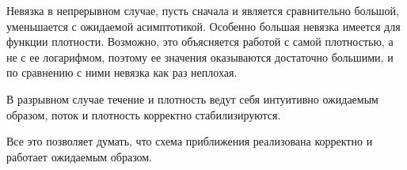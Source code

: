 \documentclass[a4paper,11pt]{article}
\begin{document}
Невязка в непрерывном случае, пусть сначала и является сравнительно большой, уменьшается с ожидаемой асимптотикой.
Особенно большая невязка имеется для функции плотности. Возможно, это объясняется работой с самой плотностью, а не с ее логарифмом,
поэтому ее значения оказываются достаточно большими, и по сравнению с ними невязка как раз неплохая.

В разрывном случае течение и плотность ведут себя интуитивно ожидаемым образом, поток и плотность корректно стабилизируются.

Все это позволяет думать, что схема приближения реализована корректно и работает ожидаемым образом.
\end{document}
